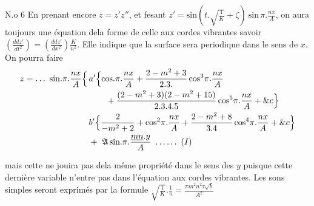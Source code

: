 \documentclass[11pt,a4paper]{article}
\begin{document}
N.o 6 En prenant encore $z = z'z''$, et fesant
$z' = \text{sin}(t.\sqrt{\tfrac{1}{K}}+\zeta)\ \text{sin}\,\pi.\frac{nx}{A}$, on aura  toujours une
équation dela forme de celle aux cordes vibrantes
savoir $\left(\frac{ddz'}{dt^2}\right) = \left(\frac{ddz'}{dx^2}\right)\frac{K}{n^2}$. Elle indique que la surface
sera periodique dans le sens de $x$. On pourra
faire
\begin{align*}
z = \ldots\ \text{sin}.\pi.\frac{nx}{A}\Bigl\{\,&a'\Bigl\{\text{cos}.\pi.\frac{nx}{A} + \frac{2-m^2+3}{2.3.}\,\text{cos}^3\pi.\frac{nx}{A}\\
&\qquad + \frac{(2-m^2+3)(2-m^2+15)}{2.3.4.5}\,\text{cos}^5\pi.\frac{nx}{A} + \&c\Bigr\}\\
&b'\Bigl\{\frac{2}{-m^2+2} + \text{cos}^2\pi.\frac{nx}{A} + \frac{2-m^2+8}{3.4}\,\text{cos}^4\pi.\frac{nx}{A} + \&c\Bigr\}\\
&+\ \mathfrak{A}\,\text{sin}.\pi.\frac{\uncertain{mn}.y}{A}\ \ldots\ldots\ (I)
\end{align*}

 mais cette  ne jouira pas dela même propriété
dans le sens des $y$ puisque cette dernière variable n'entre
pas dans l'équation aux cordes vibrantes.
Les sons simples seront exprimés par la formule $\sqrt{\tfrac{1}{K}}.\frac{1}{\pi} = \frac{\pi m^2n^2\tau\sqrt{b}}{A^2}$
\end{document}

